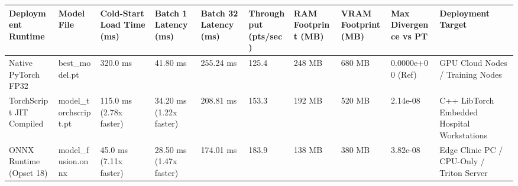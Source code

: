 \begin{tabular}{llllllllll}
\toprule
Deployment Runtime & Model File & Cold-Start Load Time (ms) & Batch 1 Latency (ms) & Batch 32 Latency (ms) & Throughput (pts/sec) & RAM Footprint (MB) & VRAM Footprint (MB) & Max Divergence vs PT & Deployment Target \\
\midrule
Native PyTorch FP32 & best_model.pt & 320.0 ms & 41.80 ms & 255.24 ms & 125.4 & 248 MB & 680 MB & 0.0000e+00 (Ref) & GPU Cloud Nodes / Training Nodes \\
TorchScript JIT Compiled & model_torchscript.pt & 115.0 ms (2.78x faster) & 34.20 ms (1.22x faster) & 208.81 ms & 153.3 & 192 MB & 520 MB & 2.14e-08 & C++ LibTorch Embedded Hospital Workstations \\
ONNX Runtime (Opset 18) & model_fusion.onnx & 45.0 ms (7.11x faster) & 28.50 ms (1.47x faster) & 174.01 ms & 183.9 & 138 MB & 380 MB & 3.82e-08 & Edge Clinic PC / CPU-Only / Triton Server \\
\bottomrule
\end{tabular}
